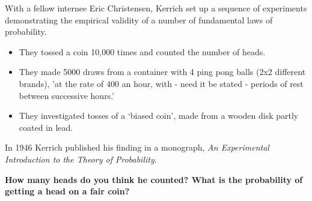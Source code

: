 \documentclass[t,xcolor=pdftex,dvipsnames,table]{beamer}\usepackage[]{graphicx}\usepackage[]{color}
\begin{document}
\begin{frame}{}


With a fellow internee Eric Christensen, Kerrich set up a sequence of experiments demonstrating the empirical validity of a number of fundamental laws of probability.

\begin{itemize}
\item They tossed a coin 10,000 times and counted the number of heads. \\
\item They made 5000 draws from a container with 4  ping pong balls (2x2 different brands), 'at the rate of 400 an hour, with - need it be stated - periods of rest between successive hours.'
\item They investigated tosses of a `biased coin', made from a wooden disk partly coated in lead.
\end{itemize}

In 1946 Kerrich published his finding in a monograph, {\it An
Experimental Introduction to the Theory of Probability}. 
\href{http://www.maths.usyd.edu.au/u/UG/JM/MATH1005/r/StatsData/Kerrich1950.pdf}{}

\vspace{.5cm}
{\bf How many heads do you think he counted? What is the probability of getting a head on a fair coin?}

\end{frame}
\end{document}
